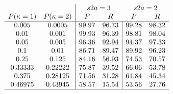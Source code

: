 \[
\begin{array}{cc|cc|cc}
\\  & %
    & \multicolumn{2}{c}{s2a=3} & \multicolumn{2}{c}{s2a=2}
\\  \multicolumn{1}{c}{P(\kappa=1)} & \multicolumn{1}{c|}{P(\kappa=2)} & \multicolumn{1}{c}{P} & \multicolumn{1}{c}{R} & \multicolumn{1}{c}{P} & \multicolumn{1}{c}{R}
\\ \hline
   0.005   & 0.0005   & 99.97 & 96.73 & 99.28 & 98.32
\\ 0.01    & 0.001    & 99.93 & 96.39 & 98.81 & 98.04
\\ 0.05    & 0.005    & 96.36 & 92.94 & 94.37 & 97.33
\\ 0.1     & 0.01     & 86.71 & 89.47 & 89.92 & 96.23
\\ 0.25    & 0.125    & 84.16 & 56.93 & 74.53 & 70.57
\\ 0.33333 & 0.22222  & 75.87 & 39.52 & 66.06 & 53.78
\\ 0.375   & 0.28125  & 71.56 & 31.28 & 61.84 & 45.34
\\ 0.46975 & 0.43945  & 58.57 & 15.54 & 53.56 & 27.76
\\ \hline
\end{array}
\]


